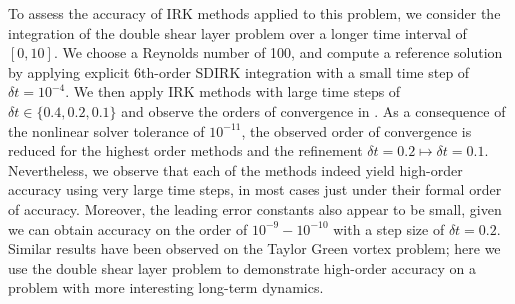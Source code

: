 \documentclass[review]{siamart}
\begin{document}
To assess the accuracy of IRK methods applied to this problem, we consider the
integration of the double shear layer problem over a longer time interval of
$[0,10]$. We choose a Reynolds number of 100, and compute a reference solution
by applying explicit 6th-order SDIRK integration with a small time step of
$\delta t = 10^{-4}$. We then apply IRK methods with large time steps of
$\delta t \in\{0.4,0.2,0.1\}$ and observe the orders of convergence in
. As a consequence of the nonlinear solver tolerance
of $10^{-11}$, the observed order of convergence is reduced for the highest
order methods and the refinement $\delta t =0.2 \mapsto \delta t=0.1$.
Nevertheless, we observe that each of the methods indeed yield high-order
accuracy using very large time steps, in most cases just under their formal
order of accuracy. Moreover, the leading error constants also appear to be
small, given we can obtain accuracy on the order of $10^{-9}-10^{-10}$ with
a step size of $\delta t = 0.2$. Similar results have been observed on the
Taylor Green vortex problem; here we use the double shear layer problem to
demonstrate high-order accuracy on a problem with more interesting long-term
dynamics.
\end{document}
